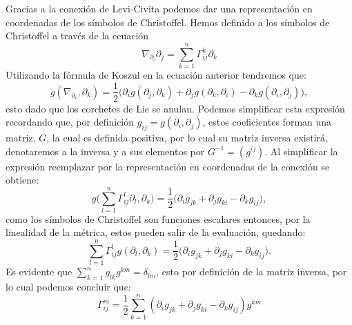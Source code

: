 Gracias a la conexión de Levi-Civita podemos dar una representación en coordenadas de los símbolos de Christoffel. Hemos definido a los símbolos de Christoffel a través de la ecuación
\[
	\nabla_{\partial_{i}} \partial_{j} = \sum_{k=1}^{n} \Gamma_{ij}^{k} \partial_{k}
\]
Utilizando la fórmula de Koszul en la ecuación anterior tendremos que:
\[
	g(\nabla_{\partial_{i}}, \partial_{k}) = \frac{1}{2} \biggl(\partial_{i}g(\partial_{j},\partial_{k}) + \partial_{j}g(\partial_{k},\partial_{i}) - \partial_{k}g(\partial_{i},\partial_{j})\biggr),
\]
esto dado que los corchetes de Lie se anulan. Podemos simplificar esta expresión recordando que, por definición $g_{ij} = g(\partial_{i}, \partial_{j})$, estos coeficientes forman una matriz, $G$, la cual es definida positiva, por lo cual su matriz inversa existirá, denotaremos a la inversa y a sus elementos por $G^{-1}=(g^{ij})$. Al simplificar la expresión reemplazar por la representación en coordenadas de la conexión se obtiene:
\[
  g\biggl(\sum_{l=1}^{n} \Gamma^{l}_{ij}\partial_{l}, \partial_{k}\biggr) = \frac{1}{2} \biggl( \partial_{i}g_{jk} + \partial_{j}g_{ki} - \partial_{k}g_{ij}\biggr),
\]
como los símbolos de Christoffel son funciones escalares entonces, por la linealidad de la métrica, estos pueden salir de la evaluación, quedando:
\[
	\sum_{l=1}^{n} \Gamma^{l}_{ij} g(\partial_{l}, \partial_{k}) = \frac{1}{2} \biggl( \partial_{i}g_{jk} + \partial_{j}g_{ki} - \partial_{k}g_{ij}\biggr).
\]
Es evidente que $\sum_{k=1}^{n}g_{lk}g^{km} = \delta_{lm}$, esto por definición de la matriz inversa, por lo cual podemos concluir que:
\[
  \Gamma_{ij}^{m} = \frac{1}{2}\sum_{k=1}^{n} (\partial_{i}g_{jk} + \partial_{j}g_{ki} - \partial_{k}g_{ij})g^{km}
\]
